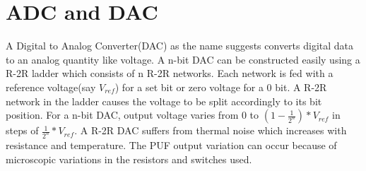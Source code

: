 \section{ADC and DAC}
A Digital to Analog Converter(DAC) as the name suggests converts digital data to an analog quantity like voltage. A n-bit DAC can be constructed easily using a R-2R ladder which consists of n R-2R networks. Each network is fed with a reference voltage(say $V_{ref}$) for a set bit or zero voltage for a 0 bit. A R-2R network in the ladder causes the voltage to be split accordingly to its bit position. For a n-bit DAC, output voltage varies from 0 to $(1-\frac{1}{2^{n}})*V_{ref}$ in steps of $\frac{1}{2^{n}}*V_{ref}$. A R-2R DAC suffers from thermal noise which increases with resistance and temperature. The PUF output variation can occur because of microscopic variations in the resistors and switches used.

